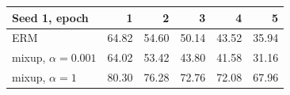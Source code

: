 \begin{tabular}{@{}lrrrrr@{}}
\toprule
Seed 1, epoch & 1 & 2 & 3 & 4 & 5\\
\midrule
ERM & 64.82 & 54.60 & 50.14 & 43.52 & 35.94\\
mixup, $\alpha=0.001$ & 64.02 & 53.42 & 43.80 & 41.58 & 31.16\\
mixup, $\alpha=1$ & 80.30 & 76.28 & 72.76 & 72.08 & 67.96\\
\bottomrule
\end{tabular}
